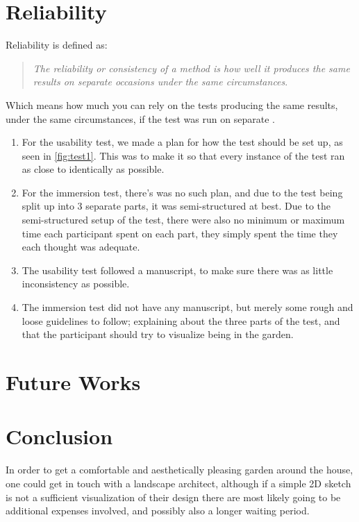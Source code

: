 \section*{Reliability}
	Reliability is defined as:\\
	\begin{quote}
		\textit{The reliability or consistency of a method is how well it produces the same results on separate occasions under the same circumstances}\cite{interactionDesign}.\\
	\end{quote}
	Which means how much you can rely on the tests producing the same results, under the same circumstances, if the test was run on separate .\\
	\begin{enumerate}
		\item For the usability test, we made a plan for how the test should be set up, as seen in \autoref{fig:test1}. This was to make it so that every instance of the test ran as close to identically as possible.\\
		
		\item For the immersion test, there's was no such plan, and due to the test being split up into 3 separate parts, it was semi-structured at best. Due to the semi-structured setup of the test, there were also no minimum or maximum time each participant spent on each part, they simply spent the time they each thought was adequate.\\
		
		\item The usability test followed a manuscript, to make sure there was as little inconsistency as possible.\\
		
		\item The immersion test did not have any manuscript, but merely some rough and loose guidelines to follow; explaining about the three parts of the test, and that the participant should try to visualize being in the garden.\\
	\end{enumerate}
	
\section {Future Works}


\section {Conclusion}
In order to get a comfortable and aesthetically pleasing garden around the house, one could get in touch with a landscape architect, although if a simple 2D sketch is not a sufficient visualization of their design there are most likely going to be additional expenses involved, and possibly also a longer waiting period.

